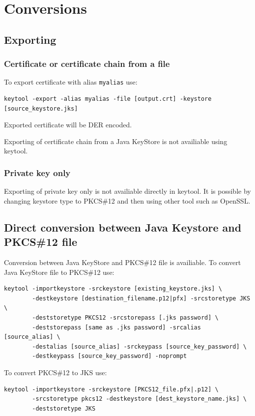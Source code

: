 \documentclass[10pt, a4paper]{report}
\begin{document}
    
\section{Conversions}

  \subsection{Exporting}
  
    \subsubsection{Certificate or certificate chain from a file}
To export certificate with alias \verb+myalias+ use:
\begin{verbatim}
keytool -export -alias myalias -file [output.crt] -keystore [source_keystore.jks]
\end{verbatim}  
Exported certificate will be DER encoded.

Exporting of certificate chain from a Java KeyStore is not availiable using keytool.

    \subsubsection{Private key only}
Exporting of private key only is not availiable directly in keytool. It is possible by changing keystore type to PKCS\#12 and then using other tool such as OpenSSL.

  \subsection{Direct conversion between Java Keystore and PKCS\#12 file}
Conversion between Java KeyStore and PKCS\#12 file is availiable. To convert Java KeyStore file to PKCS\#12 use:
\begin{verbatim}
keytool -importkeystore -srckeystore [existing_keystore.jks] \
        -destkeystore [destination_filename.p12|pfx] -srcstoretype JKS \
        -deststoretype PKCS12 -srcstorepass [.jks password] \
        -deststorepass [same as .jks password] -srcalias [source_alias] \
        -destalias [source_alias] -srckeypass [source_key_password] \
        -destkeypass [source_key_password] -noprompt
\end{verbatim}

To convert PKCS\#12 to JKS use:
\begin{verbatim}
keytool -importkeystore -srckeystore [PKCS12_file.pfx|.p12] \
        -srcstoretype pkcs12 -destkeystore [dest_keystore_name.jks] \
        -deststoretype JKS
\end{verbatim}
\end{document}

